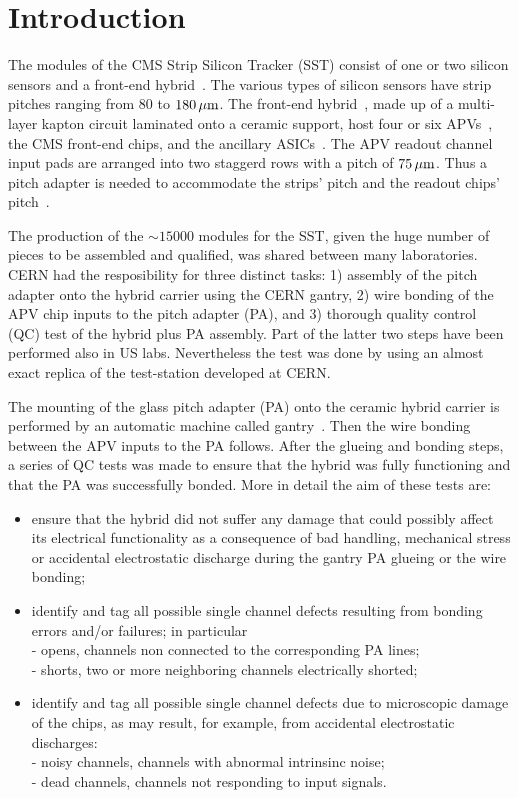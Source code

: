 \section{Introduction}

The modules of the CMS Strip Silicon Tracker (SST) consist of one or
two silicon sensors and a front-end
hybrid~\cite{bigcmspaper,tdr}. The various types of  
silicon sensors have strip pitches ranging from $80$ to $180\, \mu \rm m$. The
front-end hybrid~\cite{hybrid}, made up of a multi-layer kapton circuit laminated
onto a ceramic support, host four 
or six APVs~\cite{apv}, the CMS front-end chips, and the ancillary
ASICs~\cite{pll, dcu, apvmux}. The APV 
readout channel input pads are arranged into two staggerd rows with a
pitch of $75\, \mu \rm m$. Thus a pitch adapter is needed to accommodate the 
strips' pitch and the readout chips' pitch~\cite{pa}.
 
The production of the $\sim15000$ modules for the SST, given the huge number of
pieces to be assembled and qualified, was shared between many 
laboratories. CERN had the resposibility for three distinct tasks: 1)
assembly of the pitch adapter onto the hybrid carrier using the CERN
gantry, 2) wire bonding of the APV chip inputs to the pitch adapter (PA),
and 3) thorough quality control (QC) test of the hybrid plus PA
assembly. Part of the latter two steps have been performed also in US
labs. Nevertheless the test was done by using an almost exact replica of the
test-station developed at CERN. 

The mounting of the glass pitch adapter (PA) onto the ceramic hybrid
carrier is performed by an automatic machine called
gantry~\cite{gantry}. Then the wire bonding between the APV inputs to
the PA follows. After the glueing and bonding steps, a series of QC
tests was made to ensure that the hybrid was fully functioning and
that the PA was successfully bonded. More in detail the aim of these 
tests are:
\begin{itemize}
\item ensure that the hybrid did not suffer any damage that could
  possibly affect its electrical functionality as a consequence of bad
  handling, mechanical stress or accidental electrostatic discharge
  during the gantry PA glueing or the wire bonding;
\item identify and tag all possible single channel defects resulting
  from bonding errors and/or failures; in particular\\
- opens, channels non connected
  to the corresponding PA lines;\\
- shorts, two or more neighboring
  channels electrically shorted;
\item identify and tag all possible single channel defects due to
  microscopic damage of the chips, as may result, for example, from
  accidental electrostatic discharges:\\
- noisy channels, channels with abnormal intrinsinc noise;\\
- dead channels, channels not responding to input signals.
\end{itemize}


